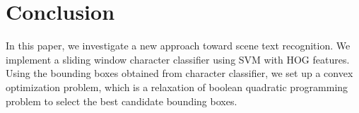 \documentclass[10pt,twocolumn,letterpaper]{article}
\begin{document}
\section{Conclusion}

In this paper, we investigate a new approach toward scene text recognition. We implement a sliding window character classifier using SVM with HOG features. Using the bounding boxes obtained from character classifier, we set up a convex optimization problem, which is a relaxation of boolean quadratic programming problem to select the best candidate bounding boxes.

{\small


}
\end{document}
